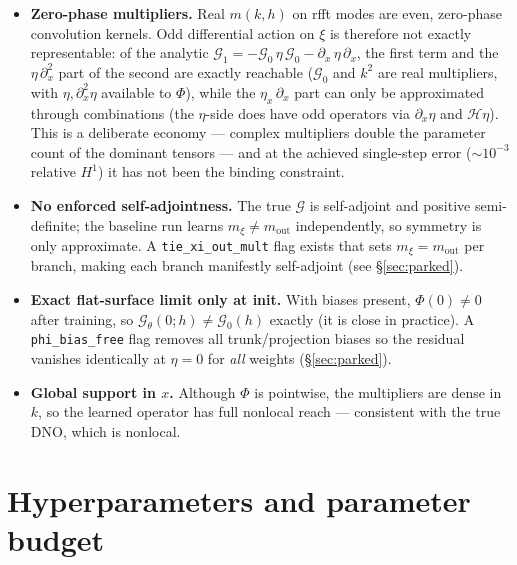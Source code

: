\documentclass[11pt,letterpaper]{article}
\newcommand{\Gop}{\mathcal{G}}
\newcommand{\Hil}{\mathcal{H}}
\begin{document}
\begin{itemize}[leftmargin=1.6em, itemsep=2pt]
\item \textbf{Zero-phase multipliers.} Real $m(k,h)$ on rfft modes are
      even, zero-phase convolution kernels. Odd differential action on $\xi$ is
      therefore not exactly representable: of the analytic
      $\Gop_1 = -\Gop_0\,\eta\,\Gop_0 - \partial_x\,\eta\,\partial_x$, the first
      term and the $\eta\,\partial_x^2$ part of the second are exactly reachable
      ($\Gop_0$ and $k^2$ are real multipliers, with $\eta,\partial_x^2\eta$
      available to $\Phi$), while the $\eta_x\,\partial_x$ part can only be
      approximated through combinations (the $\eta$-side does have odd operators
      via $\partial_x\eta$ and $\Hil\eta$). This is a deliberate economy ---
      complex multipliers double the parameter count of the dominant tensors ---
      and at the achieved single-step error ($\sim 10^{-3}$ relative $H^1$) it
      has not been the binding constraint.
\item \textbf{No enforced self-adjointness.} The true $\Gop$ is self-adjoint and
      positive semi-definite; the baseline run learns $m_\xi \ne m_{\mathrm{out}}$
      independently, so symmetry is only approximate. A
      \texttt{tie\_xi\_out\_mult} flag exists that sets
      $m_\xi = m_{\mathrm{out}}$ per branch, making each branch manifestly
      self-adjoint (see \S\ref{sec:parked}).
\item \textbf{Exact flat-surface limit only at init.} With biases present,
      $\Phi(0) \ne 0$ after training, so $\Gop_\theta(0;h) \ne \Gop_0(h)$
      exactly (it is close in practice). A \texttt{phi\_bias\_free} flag removes
      all trunk/projection biases so the residual vanishes identically at
      $\eta=0$ for \emph{all} weights (\S\ref{sec:parked}).
\item \textbf{Global support in $x$.} Although $\Phi$ is pointwise, the
      multipliers are dense in $k$, so the learned operator has full nonlocal
      reach --- consistent with the true DNO, which is nonlocal.
\end{itemize}

\section{Hyperparameters and parameter budget}
\end{document}
